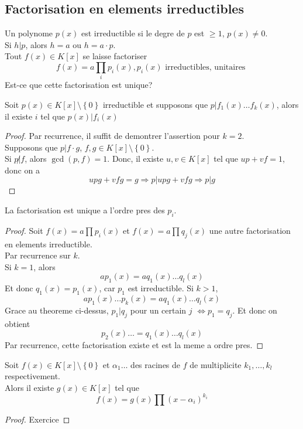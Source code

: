 \documentclass[../main.tex]{subfiles}
\begin{document}
\subsection{Factorisation en elements irreductibles}
Un polynome $p( x) $ est irreductible si le degre de $p$ est $\geq 1$, $p( x) \neq 0$.\\
Si $h | p$, alors $h=a$ ou $h=a \cdot p$.\\
Tout $f( x) \in K[x]$ se laisse factoriser
\[ 
	f( x) = a \prod_i p_i( x) , p_i( x) \text{ irreductibles, unitaires } 
\]
Est-ce que cette factorisation est unique?\\
\begin{thm}
	Soit $p( x) \in K[x] \setminus \left\{ 0 \right\}  $ irreductible et supposons que $p | f_1( x) \ldots f_k( x) $, alors il existe $i$ tel que $p( x) | f_i( x) $
\end{thm}
\begin{proof}
Par recurrence, il suffit de demontrer l'assertion pour $k=2$.\\
Supposons que $p| f \cdot g$, $f,g \in K[x] \setminus \left\{ 0 \right\} $.\\
Si $p \not | f$, alors $\gcd ( p,f) =1$. Donc, il existe $u,v \in K[x]$ tel que $up + vf=1$, donc on a
\[ 
upg + vfg =g \Rightarrow p | upg + vfg \Rightarrow p | g
\]

\end{proof}
\begin{thm}
	La factorisation est unique a l'ordre pres des $p_i$.
\end{thm}
\begin{proof}
	Soit $f( x) = a \prod p_i( x) $ et $f( x) = a \prod q_j( x) $ une autre factorisation en elements irreductible.\\
	Par recurrence sur $k$.\\
	Si $k=1$, alors
	\[ 
		ap_1( x)  = a q_1( x) \ldots q_l( x) 
	\]
	Et donc $q_1( x) = p_1( x) $, car $p_1$ est irreductible.
	Si $k>1$, 
	\[ 
		a p_1( x) \ldots p_k( x) = a q_1( x) \ldots q_l( x) 
	\]
	Grace au theoreme ci-dessus, $p_1| q_j$ pour un certain $j$ $\iff p_1 = q_j$.
	Et donc on obtient
	\[ 
		p_2( x) \ldots = q_1( x) \ldots q_l( x) 
	\]
	Par recurrence, cette factorisation existe et est la meme a ordre pres.	

\end{proof}
\begin{crly}
	Soit $f( x) \in K[x]\setminus \left\{ 0 \right\}$ et $\alpha_1 \ldots$ des racines de $f$ de multiplicite $k_1, \ldots, k_l$ respectivement.\\
	Alors il existe $g( x) \in K[x]$ tel que
	\[ 
		f( x) = g( x) \prod ( x-\alpha_i)^{k_i}
	\]
	
\end{crly}
\begin{proof}
Exercice
\end{proof}
\end{document}
